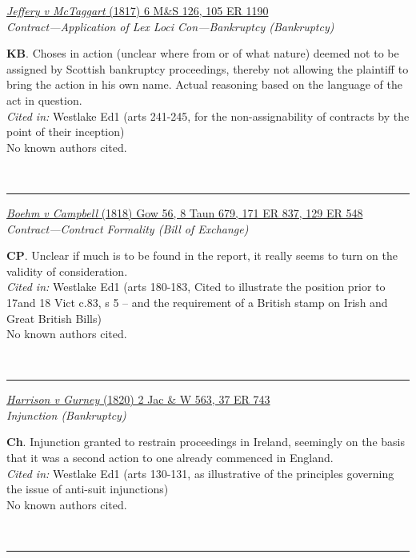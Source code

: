 \documentclass[twoside]{article}
\begin{document}
        \begin{small}
        \begin{center}
        \href{https://heinonline.org/HOL/P?h=hein.engrep/engrf0105&i=1194}{\textit{Jeffery v McTaggart} (1817) 6 M\&S 126, 105 ER 1190} \label{45} \\ 
\textit{Contract---Application of Lex Loci Con---Bankruptcy (Bankruptcy)}\\
        \end{center}
        \textbf{KB}. Choses in action (unclear where from or of what nature) deemed not to be assigned by Scottish bankruptcy proceedings, thereby not allowing the plaintiff to bring the action in his own name. Actual reasoning based on the language of the act in question.\\\textit{Cited in: }Westlake Ed1 (arts 241-245, for the non-assignability of contracts by the point of their inception)\\No known authors cited.
        \end{small}\\
        \rule{\textwidth}{0.5pt}
        

        \begin{small}
        \begin{center}
        \href{https://heinonline.org/HOL/P?h=hein.engrep/engrg0129&i=552}{\textit{Boehm v Campbell} (1818) Gow 56, 8 Taun 679, 171 ER 837, 129 ER 548} \label{60} \\ 
\textit{Contract---Contract Formality (Bill of Exchange)}\\
        \end{center}
        \textbf{CP}. Unclear if much is to be found in the report, it really seems to turn on the validity of consideration.\\\textit{Cited in: }Westlake Ed1 (arts 180-183, Cited to illustrate the position prior to 17and 18 Vict c.83, s 5 -- and the requirement of a British stamp on Irish and Great British Bills)\\No known authors cited.
        \end{small}\\
        \rule{\textwidth}{0.5pt}
        

        \begin{small}
        \begin{center}
        \href{https://heinonline.org/HOL/P?h=hein.engrep/engrc0037&i=751}{\textit{Harrison v Gurney} (1820) 2 Jac \& W 563, 37 ER 743} \label{65} \\ 
\textit{Injunction (Bankruptcy)}\\
        \end{center}
        \textbf{Ch}. Injunction granted to restrain proceedings in Ireland, seemingly on the basis that it was a second action to one already commenced in England.\\\textit{Cited in: }Westlake Ed1 (arts 130-131, as illustrative of the principles governing the issue of anti-suit injunctions)\\No known authors cited.
        \end{small}\\
        \rule{\textwidth}{0.5pt}
        
\end{document}
